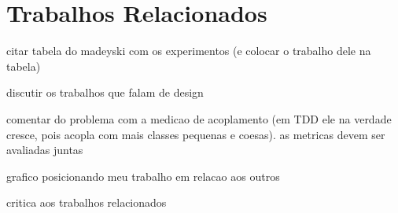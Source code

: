 \chapter{Trabalhos Relacionados}
\label{cap:trabalhos-relacionados}

citar tabela do madeyski com os experimentos (e colocar o trabalho dele na tabela)

discutir os trabalhos que falam de design

comentar do problema com a medicao de acoplamento (em TDD ele na verdade cresce, pois acopla com mais classes pequenas e coesas).
as metricas devem ser avaliadas juntas

grafico posicionando meu trabalho em relacao aos outros

critica aos trabalhos relacionados